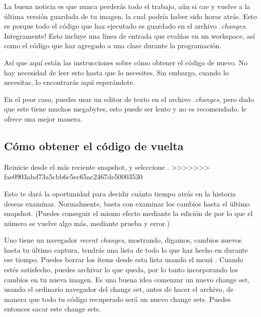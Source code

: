 \documentclass[spanish,a4paper,10pt,twoside]{book}
\begin{document}
La buena noticia es que nunca perder\'as todo el trabajo, a\'un si cae y vuelve a la \'ultima versi\'on guardada de tu imagen, la cual podr\'ia haber sido horas atr\'as.
Esto es porque todo el c\'odigo que haz ejecutado es guardado en el archivo \emph{.changes}.
Integramente!
Esto incluye una l\'inea de entrada que eval\'uas en un workspace, as\'i como el c\'odigo que haz agregado a una clase durante la programaci\'on.

As\'i que aqu\'i est\'an las instrucciones sobre c\'omo obtener el c\'odigo de nuevo.
No hay necesidad de leer esto hasta que lo necesites.
Sin embargo, cuando lo necesitas, lo encontrar\'as aqu\'i esper\'andote.

En el peor caso, puedes usar un editor de texto en el archivo \emph{.changes}, pero dado que este tiene muchos megabytes, esto puede ser lento y no es recomendado.
\pharo le ofrece una mejor manera.

\subsection{C\'omo obtener el c\'odigo de vuelta}
Reinicie \pharo desde el m\'as reciente snapshot, y seleccione .
>>>>>>> fae0903abd73a5cbb6c5ec65ac2467de50003530




Esto te dar\'a la oportunidad para decidir cu\'anto tiempo atr\'as en la historia deseas examinar. Normalmente, basta con examinar los cambios hasta el \'ultimo snapshot. (Puedes conseguir el mismo efecto mediante la edici\'on de  por lo que el n\'umero  se vuelve algo m\'as, mediante prueba y error.)

Uno tiene un navegador \emph{recent changes}, mostrando, digamos, cambios nuevos
hasta tu \'ultimo captura, tendr\'as una lista de todo lo que haz hecho en
\pharo durante ese tiempo. Puedes borrar los \'items desde esta lista usando el men\'u \actclick. Cuando est\'es satisfecho, puedes archivar lo que queda, por lo tanto incorporando los cambios en tu nueva imagen.
Es una buena idea comenzar un nuevo change set, usando el ordinario navegador del change set, antes de hacer el archivo, de manera que todo tu c\'odigo recuperado ser\'a un nuevo change sets.
Puedes entonces sacar este change sets.
\end{document}
